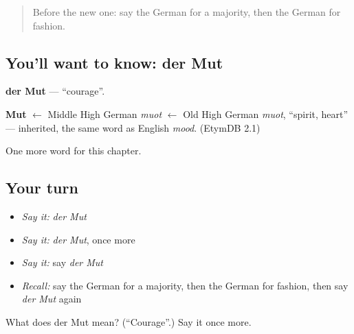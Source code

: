 \begin{quote}
Before the new one: say the German for a majority, then the German for fashion.
\end{quote}

\subsection*{You'll want to know: der Mut}
\textbf{der Mut} — \textquotedblleft{}courage\textquotedblright{}.

\begin{cousinweb}
\textbf{Mut} $\leftarrow$ Middle High German \emph{muot} $\leftarrow$ Old High German \emph{muot}, \textquotedblleft{}spirit, heart\textquotedblright{} — inherited, the same word as English \emph{mood}. (EtymDB 2.1)
\end{cousinweb}

\begin{grammarlens}[title={What you've built}]
One more word for this chapter.
\end{grammarlens}

\subsection*{Your turn}
\begin{itemize}
\raggedright
  \item \emph{Say it:} \emph{der Mut}
  \item \emph{Say it:} \emph{der Mut}, once more
  \item \emph{Say it:} say \emph{der Mut}
  \item \emph{Recall:} say the German for a majority, then the German for fashion, then say \emph{der Mut} again
\end{itemize}

\begin{tcolorbox}[breakable,colback=teal!4,colframe=teal!35!black,title={Before you move on}]
What does der Mut mean? (\textquotedblleft{}Courage\textquotedblright{}.) Say it once more.
\end{tcolorbox}
